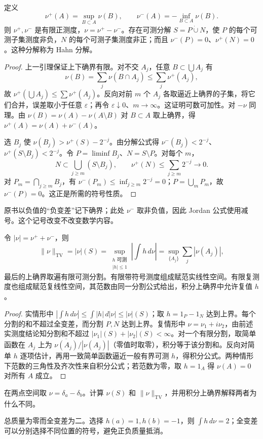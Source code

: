 \begin{theorem}\label{thm:y1-jordan}
定义
\[
 \nu^+(A)=\sup_{B\subset A}\nu(B),\qquad
 \nu^-(A)=-\inf_{B\subset A}\nu(B).
\]
则 $\nu^+,\nu^-$ 是有限正测度，$\nu=\nu^+-\nu^-$。存在可测分解 $S=P\mathbin{\dot\cup}N$，使 $P$ 的每个可测子集测度非负，$N$ 的每个可测子集测度非正；而且 $\nu^-(P)=0$、$\nu^+(N)=0$。这种分解称为 Hahn 分解。
\end{theorem}
\begin{proof}
上一引理保证上下确界有限。对不交 $A_j$，任意 $B\subset\bigcup A_j$ 有
\[
 \nu(B)=\sum_j\nu(B\cap A_j)\le\sum_j\nu^+(A_j),
\]
故 $\nu^+(\bigcup A_j)\le\sum\nu^+(A_j)$。反向对前 $m$ 个 $A_j$ 各取逼近上确界的子集，将它们合并，误差取小于任意 $\varepsilon$；再令 $\varepsilon\downarrow0$、$m\to\infty$。这证明可数可加性。对 $-\nu$ 同理。由 $\nu(B)=\nu(A)-\nu(A\setminus B)$ 对 $B\subset A$ 取上确界，得 $\nu^+(A)=\nu(A)+\nu^-(A)$。

选 $B_j$ 使 $\nu(B_j)>\nu^+(S)-2^{-j}$。由分解公式得 $\nu^-(B_j)<2^{-j}$、$\nu^+(S\setminus B_j)<2^{-j}$。令 $P=\liminf B_j$、$N=S\setminus P$。对每个 $m$，
\[
 N\subset\bigcup_{j\ge m}(S\setminus B_j),\qquad
 \nu^+(N)\le\sum_{j\ge m}2^{-j}\to0.
\]
对 $P_m=\bigcap_{j\ge m}B_j$，有 $\nu^-(P_m)\le\inf_{j\ge m}2^{-j}=0$；$P=\bigcup_mP_m$，故 $\nu^-(P)=0$。这正是所需的符号性质。
\end{proof}
原书以负值的“负变差”记下确界；此处 $\nu^-$ 取非负值，因此 Jordan 公式使用减号。这个记号改变不改变数学内容。

\begin{proposition}[全变差范数]\label{prop:y1-variation}
令 $|\nu|=\nu^++\nu^-$，则
\[
 \|\nu\|_{\mathrm{TV}}=|\nu|(S)
 =\sup_{\substack{h\text{ 可测}\\|h|\le1}}
 \left|\int h\,d\nu\right|
 =\sup_{\{A_j\}}\sum_j|\nu(A_j)|,
\]
最后的上确界取遍有限可测分割。有限带符号测度组成赋范实线性空间。有限复测度也组成赋范复线性空间，其范数由同一分割公式给出，积分上确界中允许复值 $h$。
\end{proposition}
\begin{proof}
实情形中 $|\int h\,d\nu|\le\int|h|\,d|\nu|\le|\nu|(S)$；取 $h=1_P-1_N$ 达到上界。每个分割的和不超过全变差，而分割 $P,N$ 达到上界。复情形中 $\nu=\nu_1+i\nu_2$，由前述实测度结论知分割和不超过 $|\nu_1|(S)+|\nu_2|(S)<\infty$。对一个有限分割，取简单函数在 $A_j$ 上为 $\overline{\nu(A_j)}/|\nu(A_j)|$（零值时取零），积分等于该分割和。反向对简单 $h$ 逐项估计，再用一致简单函数逼近一般有界可测 $h$，得积分公式。两种情形下范数的三角性及齐次性来自积分公式；若范数为零，取 $h=1_A$ 得 $\nu(A)=0$ 对所有 $A$ 成立。
\end{proof}

\begin{exercise}[补充：全变差不是总质量的绝对值]
在两点空间取 $\nu=\delta_a-\delta_b$。计算 $\nu(S)$ 和 $\|\nu\|_{\mathrm{TV}}$，并用积分上确界解释两者为什么不同。
\end{exercise}
\begin{solution}
总质量为零而全变差为二。选择 $h(a)=1,h(b)=-1$，则 $\int h\,d\nu=2$；全变差可以分别选择不同位置的符号，避免正负质量抵消。
\end{solution}

